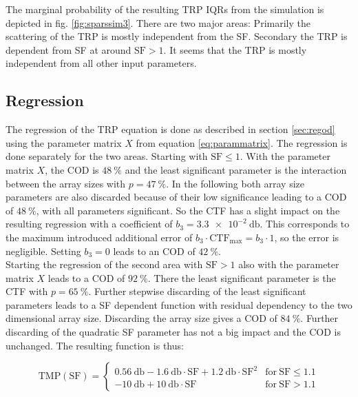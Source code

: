 The marginal probability of the resulting \ac{TRP} \acp{IQR} from the simulation is depicted in fig. \ref{fig:sparssim3}. There are two major areas: Primarily the scattering of the \ac{TRP} is mostly independent from the \ac{SF}. Secondary the \ac{TRP} is dependent from \ac{SF} at around $\text{SF} > 1$. It seems that the \ac{TRP} is mostly independent from all other input parameters.

\subsection{Regression}

The regression of the \ac{TRP} equation is done as described in section \ref{sec:regod} using the parameter matrix $X$ from equation \ref{eq:parammatrix}. The regression is done separately for the two areas. Starting with $\text{SF}\le 1$. With the parameter matrix $X$, the \ac{COD} is $\SI{48}{\percent}$ and the least significant parameter is the interaction between the array sizes with $p = \SI{47}{\percent}$. In the following both array size parameters are also discarded because of their low significance leading to a \ac{COD} of $\SI{48}{\percent}$, with all parameters significant. So the \ac{CTF} has a slight impact on the resulting regression with a coefficient of $b_3=\SI{3.3e-2}{\decibel}$. This corresponds to the maximum introduced additional error of $b_3\cdot\text{CTF}_\text{max}=b_3\cdot 1$, so the error is negligible. Setting $b_3 = 0$ leads to an \ac{COD} of $\SI{42}{\percent}$.\\
Starting the regression of the second area with $\text{SF} > 1$ also with the parameter matrix $X$ leads to a \ac{COD} of $\SI{92}{\percent}$. There the least significant parameter is the \ac{CTF} with $p = \SI{65}{\percent}$. Further stepwise discarding of the least significant parameters leads to a \ac{SF} dependent function with residual dependency to the two dimensional array size. Discarding the array size gives a \ac{COD} of $\SI{84}{\percent}$. Further discarding of the quadratic \ac{SF} parameter has not a big impact and the \ac{COD} is unchanged. The resulting function is thus:

\begin{equation}
\text{TMP}\left(\text{SF}\right)=\begin{cases} 
\SI{0.56}{\decibel}-\SI{1.6}{\decibel}\cdot \text{SF}+\SI{1.2}{\decibel}\cdot\text{SF}^2 & \text{for}\ \text{SF}\le 1.1\\
\SI{-10}{\decibel}+\SI{10}{\decibel}\cdot\text{SF} & \text{for}\ \text{SF}>1.1\end{cases}
\end{equation}

